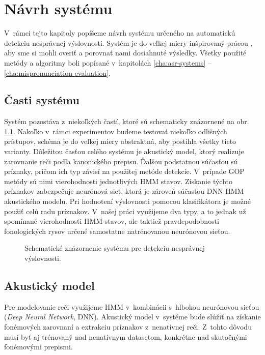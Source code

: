 \chapter{Návrh systému} \label{cha:proposed-system}

V~rámci tejto kapitoly popíšeme návrh systému určeného na automatickú detekciu nesprávnej výslovnosti. Systém je do veľkej miery inšpirovaný prácou \cite{Arora2017}, aby sme si mohli overiť a porovnať nami dosiahnuté výsledky. Všetky použité metódy a algoritmy boli popísané v~kapitolách \ref{cha:asr-systems} -- \ref{cha:mispronunciation-evaluation}.

\section{Časti systému}

Systém pozostáva z~niekoľkých častí, ktoré sú schematicky znázornené na obr. \ref{fig:system-design}. 
Nakoľko v~rámci experimentov budeme testovať niekoľko odlišných prístupov, schéma je do veľkej miery abstraktná, aby postihla všetky tieto varianty.
Dôležitou časťou celého systému je akustický model, ktorý realizuje zarovnanie reči podľa kanonického prepisu. Ďalšou podstatnou súčasťou sú príznaky, pričom ich typ závisí na použitej metóde detekcie. V~prípade GOP metódy sú nimi vierohodnosti jednotlivých HMM stavov. Získanie týchto príznakov zabezpečuje neurónová sieť, ktorá je zároveň súčasťou DNN-HMM akustického modelu. Pri hodnotení výslovnosti pomocou klasifikátora je možné použiť celú radu príznakov. V~našej práci využijeme dva typy, a to jednak už spomínané vierohodnosti HMM stavov, ale taktiež pravdepodobnosti fonologických rysov určené samostatne natrénovanou neurónovou sieťou.

\begin{figure}
    \centering
    
    \caption{Schematické znázornenie systému pre detekciu nesprávnej výslovnosti.}
    \label{fig:system-design}
\end{figure}


\section{Akustický model}

Pre modelovanie reči využijeme HMM v~kombinácii s~hlbokou neurónovou sieťou (\textit{Deep Neural Network}, DNN). Akustický model v~systéme bude slúžiť na získanie fonémových zarovnaní a extrakciu príznakov z~nenatívnej reči. Z~tohto dôvodu musí byť aj trénovaný nad nenatívnym datasetom, konkrétne nad skutočnými fonémovými prepismi.

